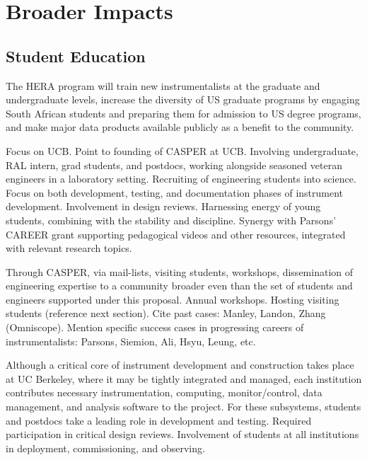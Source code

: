 \documentclass[preprint]{aastex}
\begin{document}
\section{Broader Impacts} %



\subsection{Student Education}

The HERA program will train new instrumentalists at the graduate and undergraduate levels, increase the
diversity of US graduate programs by engaging South African students and preparing them for admission to US degree programs, and make major data products available publicly as a benefit to the community.

Focus on UCB. 
Point to founding of CASPER at UCB.
Involving undergraduate, RAL intern, grad students, and postdocs, working alongside seasoned veteran engineers in a laboratory setting.
Recruiting of engineering students into science.
Focus on both development, testing, and documentation phases of instrument development.  
Involvement in design reviews.
Harnessing energy of young students, combining with the stability and discipline.
Synergy with Parsons' CAREER grant supporting pedagogical videos and other resources, integrated with relevant
research topics.

Through CASPER, via mail-lists, visiting students, workshops, dissemination of engineering expertise to a community broader
even than the set of students and engineers supported under this proposal.
Annual workshops.
Hosting visiting students (reference next section). Cite past cases: Manley, Landon, Zhang (Omniscope).
Mention specific success cases in progressing careers of instrumentalists: Parsons, Siemion, Ali, Hsyu, Leung, etc.

Although a critical core of instrument development and construction takes place at UC Berkeley, where it may be tightly
integrated and managed, each institution contributes necessary instrumentation, computing, monitor/control, data management, and
analysis software to the project.  
For these subsystems, students and postdocs take a leading role in development and testing.
Required participation in critical design reviews.
Involvement of students at all institutions in deployment, commissioning, and observing.
\end{document}

